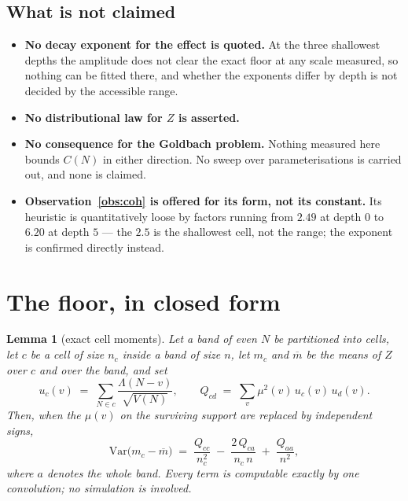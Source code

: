 \documentclass[11pt,a4paper]{article}
\theoremstyle{plain}
\newtheorem{lemma}[theorem]{Lemma}
\theoremstyle{definition}
\theoremstyle{remark}
\begin{document}
\subsection{What is not claimed}\label{sec:notclaimed}

\begin{itemize}
\item \textbf{No decay exponent for the effect is quoted.} At the
three shallowest depths the amplitude does not clear the exact floor
at any scale measured, so nothing can be fitted there, and whether the
exponents differ by depth is not decided by the accessible range.
\item \textbf{No distributional law for $Z$ is asserted.}
\item \textbf{No consequence for the Goldbach problem.} Nothing
measured here bounds $C(N)$ in either direction. No sweep over
parameterisations is carried out, and none is claimed.
\item \textbf{Observation~\ref{obs:coh} is offered for its form, not
its constant.} Its heuristic is quantitatively loose by factors
running from $2.49$ at depth $0$ to $6.20$ at depth $5$ --- the $2.5$
is the shallowest cell, not the range; the exponent is confirmed
directly instead.
\end{itemize}

\section{The floor, in closed form}\label{sec:floor}

\begin{lemma}[exact cell moments]\label{lem:cellmom}
Let a band of even $N$ be partitioned into cells, let $c$ be a cell of
size $n_c$ inside a band of size $n$, let $m_c$ and $\overline m$ be
the means of $Z$ over $c$ and over the band, and set
\[
  u_c(v)\;=\;\sum_{N\in c}\frac{\Lambda(N-v)}{\sqrt{V(N)}},
  \qquad
  Q_{cd}\;=\;\sum_v\mu^2(v)\,u_c(v)\,u_d(v).
\]
Then, when the $\mu(v)$ on the surviving support are replaced by
independent signs,
\begin{equation}\label{eq:cellmom}
  \mathrm{Var}\bigl(m_c-\overline m\bigr)
  \;=\;\frac{Q_{cc}}{n_c^{2}}
  \;-\;\frac{2\,Q_{ca}}{n_c\,n}
  \;+\;\frac{Q_{aa}}{n^{2}},
\end{equation}
where $a$ denotes the whole band. Every term is computable exactly by
one convolution; no simulation is involved.
\end{lemma}
\end{document}
